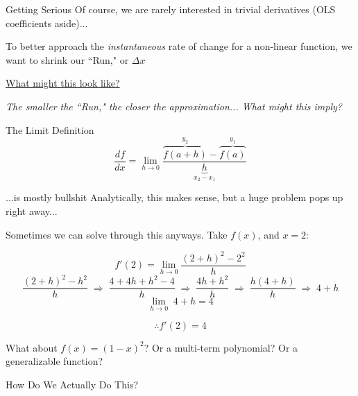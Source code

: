 \documentclass[10pt]{beamer}
\begin{document}
\begin{frame}{Getting Serious}
    Of course, we are rarely interested in trivial derivatives (OLS coefficients aside)... \\

    \vspace{.5cm}

    To better approach the \textit{instantaneous} rate of change for a non-linear function, we want to shrink our ``Run," or $\Delta x$ \\

    \vspace{.5cm}

    \textcolor{purple}{\href{https://www.desmos.com/calculator/aqv7kipsmt}{What might this look like?}} \\

    \pause

    \vspace{.5cm}

    \textit{The smaller the ``Run," the closer the approximation... What might this imply?}  
\end{frame}

\begin{frame}{The Limit Definition}
    \[\frac{df}{dx} = \lim_{h \to 0}\frac{\overbrace{f(a+h)}^{y_2}-\overbrace{f(a)}^{y_1}}{\underbrace{h}_{x_2 - x_1}}\]
\end{frame}


\begin{frame}{...is mostly bullshit}
    Analytically, this makes sense, but a huge problem pops up right away... \\

    \vspace{.5cm}

    Sometimes we can solve through this anyways. Take $f(x)$, and $x=2$:

    \[f'(2) = \lim_{h \to 0} \frac{(2+h)^2 - 2^2}{h}\]
    \vspace{.2cm}
    \[ \frac{(2+h)^2 - h^2}{h} \; \Rightarrow \; \frac{4+4h+h^2 - 4}{h} \; \Rightarrow \; \frac{4h + h^2}{h}\; \Rightarrow \; \frac{h(4+h)}{h}\;  \Rightarrow \; 4+h\]
    \vspace{.2cm}
    \[ \lim_{h \to 0} \; 4+h = 4\]

    \[ \therefore f'(2)= 4\]

    What about $f(x) = (1-x)^2$? Or a multi-term polynomial? Or a generalizable function?
\end{frame}

\begin{frame}
\thispagestyle{empty}
\vspace{1cm}
\begin{center}
\begin{Huge}
    How Do We Actually Do This?
\end{Huge}
\end{center}
\end{frame}
\end{document}
